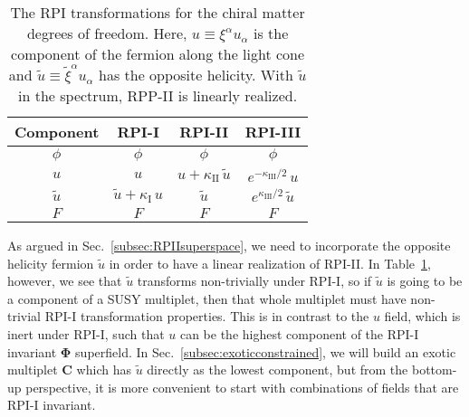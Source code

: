 \documentclass[12pt,document,nofootinbib,superscriptaddress,onecolumn,preprintnumbers,balancelastpage]{article}
\newcommand{\rpii}{{\kappa_\text{I}}}
\newcommand{\rpiii}{{\kappa_\text{II}}}
\newcommand{\rpiiii}{{\kappa_\text{III}}}
\DeclareRobustCommand{\Sec}[1]{Sec.~\ref{#1}}
\DeclareRobustCommand{\Tab}[1]{Table~\ref{#1}}
\newcommand{\bPhi}{ \boldsymbol \Phi}
\newcommand{\bC}{ \boldsymbol C}
\newcommand{\uu}{\tilde u}
\begin{document}
\begin{spacing}{1.2}
\begin{table}[t]
\renewcommand{\arraystretch}{1.8}
\setlength{\arrayrulewidth}{.3mm}
\centering
\small
\setlength{\tabcolsep}{0.45 em}
% 
\begin{tabular}{ |c || c | c | c | }
    \hline
    Component &  RPI-I &  RPI-II &   RPI-III   \\ \hline  \hline
   $\phi  $ &    $\phi$  &   $\phi$ &    $ \phi$    \\  
   $ u $ &   $u$ &   $ u + \rpiii\, \uu$ &   $  e^{-\rpiiii/2}\, u $   \\ 
   $ \uu $ &   $\uu  +\rpii\, u$ &   $\uu$ &   $  e^{\rpiiii/2}\, \uu $    \\ 
    $F  $ &    $F$  &   $F$ &    $ F$    \\
    \hline   
\end{tabular}
\caption{
%
The RPI transformations for the chiral matter degrees of freedom.
%
Here, $u \equiv \xi^\alpha u_\alpha$ is the component of the fermion along the light cone and $\uu \equiv \tilde{\xi}^\alpha u_\alpha$ has the opposite helicity.
%
With $\uu$ in the spectrum, RPP-II is linearly realized.
}
\label{table:RPIfieldsChiral}
\end{table}


As argued in \Sec{subsec:RPIIsuperspace}, we need to incorporate the opposite helicity fermion $\uu$ in order to have a linear realization of RPI-II.
%
In \Tab{table:RPIfieldsChiral}, however, we see that $\uu$ transforms non-trivially under RPI-I, so if $\uu$ is going to be a component of a SUSY multiplet, then that whole multiplet must have non-trivial RPI-I transformation properties.
%
This is in contrast to the $u$ field, which is inert under RPI-I, such that $u$ can be the highest component of the RPI-I invariant $\bPhi$ superfield.
%
In \Sec{subsec:exoticconstrained}, we will build an exotic multiplet $\bC$ which has $\uu$ directly as the lowest component, but from the bottom-up perspective, it is more convenient to start with combinations of fields that are RPI-I invariant.



\end{spacing}
\end{document}
